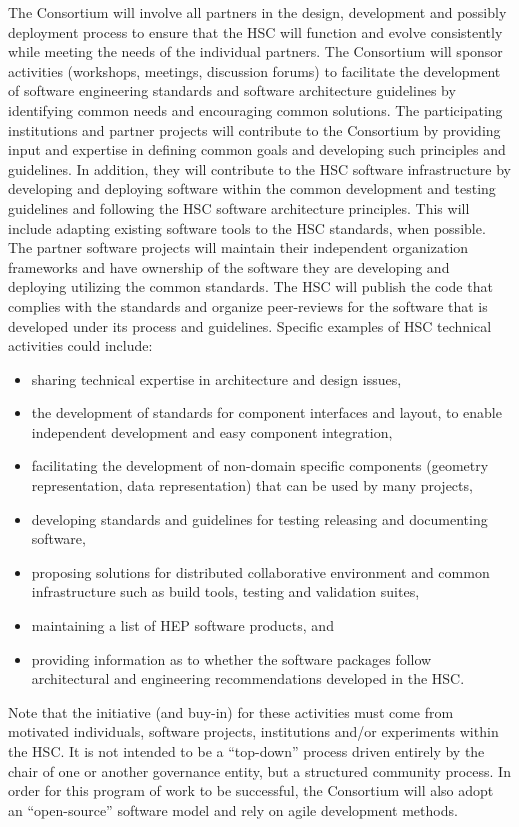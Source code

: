 \documentclass[12pt,letterpaper,fleqn]{article}
\begin{document}
The Consortium will involve all partners in the design, development
and possibly deployment process to ensure that the HSC will function
and evolve consistently while meeting the needs of the individual
partners.  The Consortium will sponsor activities (workshops,
meetings, discussion forums) to facilitate the development of
software engineering standards and software architecture guidelines
by identifying common needs and encouraging common solutions. The
participating institutions and partner projects will contribute to
the Consortium by providing input and expertise in defining common
goals and developing such principles and guidelines.  In addition,
they will contribute to the HSC software infrastructure by developing
and deploying software within the common development and testing
guidelines and following the HSC software architecture principles.
This will include adapting existing software tools to the HSC
standards, when possible.  The partner software projects will
maintain their
independent organization frameworks and have ownership of the
software they are developing and deploying utilizing the common
standards.  The HSC will publish the code that complies with the
standards and organize peer-reviews for the software that is developed
under its process and guidelines.  Specific examples of HSC technical
activities could include:
\begin{itemize}
\item sharing technical expertise in architecture and design issues,
\item the development of standards for component interfaces and layout, to
enable independent development and easy component integration,
\item facilitating the development of non-domain specific components
(geometry representation, data representation) that can be used
by many projects,
\item developing standards and guidelines for testing releasing and
documenting software,
\item proposing solutions for distributed collaborative environment
and common infrastructure such as build tools, testing and validation
suites,
\item maintaining a list of HEP software products, and
\item providing information as to whether the software packages follow
architectural and engineering recommendations developed in the HSC.
\end{itemize}

Note that the initiative (and buy-in) for these activities
must come from motivated
individuals, software projects, institutions and/or experiments within
the HSC. It is not intended to be a ``top-down'' process driven
entirely by the chair of one or another governance entity, but
a structured community process. In order for this program of work
to be successful, the Consortium will also adopt an ``open-source''
software model and rely on agile development methods.  
\end{document}
